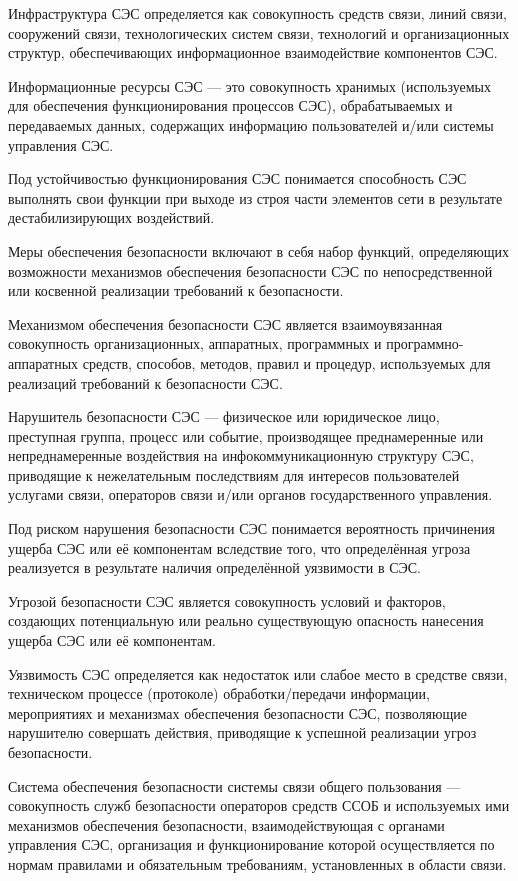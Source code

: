 \documentclass[12pt, russian, oneside, article]{ncc}
\begin{document}
Инфраструктура СЭС определяется как совокупность средств связи, линий связи, сооружений связи, технологических систем связи, технологий и организационных структур, обеспечивающих информационное взаимодействие компонентов СЭС.

Информационные ресурсы СЭС --- это совокупность хранимых (используемых для обеспечения функционирования процессов СЭС), обрабатываемых и передаваемых данных, содержащих информацию пользователей и/или системы управления СЭС.

Под устойчивостью функционирования СЭС понимается способность СЭС выполнять свои функции при выходе из строя части элементов сети в результате дестабилизирующих воздействий.

Меры обеспечения безопасности включают в себя набор функций, определяющих возможности механизмов обеспечения безопасности СЭС по непосредственной или косвенной реализации требований к безопасности.

Механизмом обеспечения безопасности СЭС является взаимоувязанная совокупность организационных, аппаратных, программных и программно-аппаратных средств, способов, методов, правил и процедур, используемых для реализаций требований к безопасности СЭС.

Нарушитель безопасности СЭС --- физическое или юридическое лицо, преступная группа, процесс или событие, производящее преднамеренные или непреднамеренные воздействия на инфокоммуникационную структуру СЭС, приводящие к нежелательным последствиям для интересов пользователей услугами связи, операторов связи и/или органов государственного управления.

Под риском нарушения безопасности СЭС понимается вероятность причинения ущерба СЭС или её компонентам вследствие того, что определённая угроза реализуется в результате наличия определённой уязвимости в СЭС.

Угрозой безопасности СЭС является совокупность условий и факторов, создающих потенциальную или реально существующую опасность нанесения ущерба СЭС или её компонентам.

Уязвимость СЭС определяется как недостаток или слабое место в средстве связи, техническом процессе (протоколе) обработки/передачи информации, мероприятиях и механизмах обеспечения безопасности СЭС, позволяющие нарушителю совершать действия, приводящие к успешной реализации угроз безопасности.

Система обеспечения безопасности системы связи общего пользования --- совокупность служб безопасности операторов средств ССОБ и используемых ими механизмов обеспечения безопасности, взаимодействующая с органами управления СЭС, организация и функционирование которой осуществляется по нормам правилами и обязательным требованиям, установленных в области связи.
\end{document}
